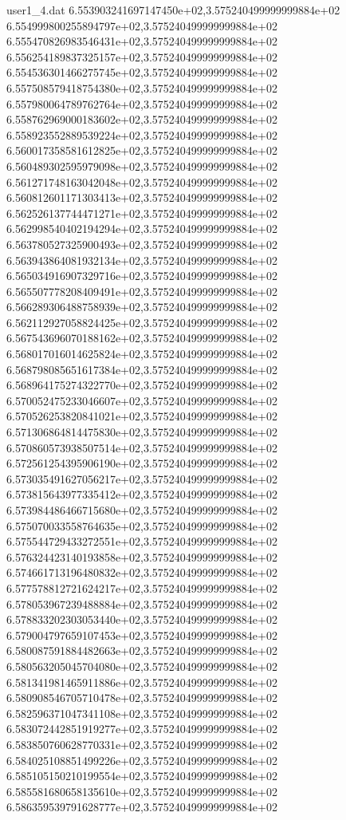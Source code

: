 \begin{filecontents}{user1_4.dat}
6.553903241697147450e+02,3.575240499999999884e+02
6.554999800255894797e+02,3.575240499999999884e+02
6.555470826983546431e+02,3.575240499999999884e+02
6.556254189837325157e+02,3.575240499999999884e+02
6.554536301466275745e+02,3.575240499999999884e+02
6.557508579418754380e+02,3.575240499999999884e+02
6.557980064789762764e+02,3.575240499999999884e+02
6.558762969000183602e+02,3.575240499999999884e+02
6.558923552889539224e+02,3.575240499999999884e+02
6.560017358581612825e+02,3.575240499999999884e+02
6.560489302595979098e+02,3.575240499999999884e+02
6.561271748163042048e+02,3.575240499999999884e+02
6.560812601171303413e+02,3.575240499999999884e+02
6.562526137744471271e+02,3.575240499999999884e+02
6.562998540402194294e+02,3.575240499999999884e+02
6.563780527325900493e+02,3.575240499999999884e+02
6.563943864081932134e+02,3.575240499999999884e+02
6.565034916907329716e+02,3.575240499999999884e+02
6.565507778208409491e+02,3.575240499999999884e+02
6.566289306488758939e+02,3.575240499999999884e+02
6.562112927058824425e+02,3.575240499999999884e+02
6.567543696070188162e+02,3.575240499999999884e+02
6.568017016014625824e+02,3.575240499999999884e+02
6.568798085651617384e+02,3.575240499999999884e+02
6.568964175274322770e+02,3.575240499999999884e+02
6.570052475233046607e+02,3.575240499999999884e+02
6.570526253820841021e+02,3.575240499999999884e+02
6.571306864814475830e+02,3.575240499999999884e+02
6.570860573938507514e+02,3.575240499999999884e+02
6.572561254395906190e+02,3.575240499999999884e+02
6.573035491627056217e+02,3.575240499999999884e+02
6.573815643977335412e+02,3.575240499999999884e+02
6.573984486466715680e+02,3.575240499999999884e+02
6.575070033558764635e+02,3.575240499999999884e+02
6.575544729433272551e+02,3.575240499999999884e+02
6.576324423140193858e+02,3.575240499999999884e+02
6.574661713196480832e+02,3.575240499999999884e+02
6.577578812721624217e+02,3.575240499999999884e+02
6.578053967239488884e+02,3.575240499999999884e+02
6.578833202303053440e+02,3.575240499999999884e+02
6.579004797659107453e+02,3.575240499999999884e+02
6.580087591884482663e+02,3.575240499999999884e+02
6.580563205045704080e+02,3.575240499999999884e+02
6.581341981465911886e+02,3.575240499999999884e+02
6.580908546705710478e+02,3.575240499999999884e+02
6.582596371047341108e+02,3.575240499999999884e+02
6.583072442851919277e+02,3.575240499999999884e+02
6.583850760628770331e+02,3.575240499999999884e+02
6.584025108851499226e+02,3.575240499999999884e+02
6.585105150210199554e+02,3.575240499999999884e+02
6.585581680658135610e+02,3.575240499999999884e+02
6.586359539791628777e+02,3.575240499999999884e+02

\end{filecontents}
